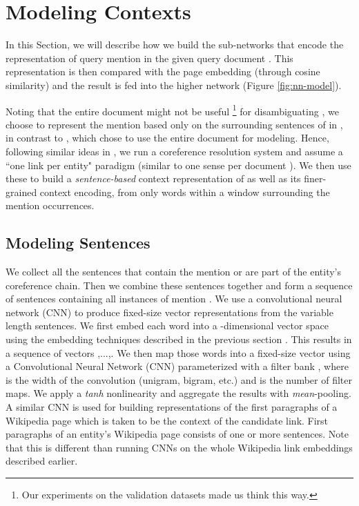 \documentclass[letterpaper]{article} \usepackage{aaai18}  \usepackage{times}  \usepackage{helvet}  \usepackage{courier}  \usepackage{url}  \usepackage{graphicx}  \frenchspacing  \setlength{\pdfpagewidth}{8.5in}  \setlength{\pdfpageheight}{11in}  \usepackage{latexsym}
\begin{document}
%
 \section{Modeling Contexts}
\label{sec:repr-details}
In this Section, we will describe how we build the sub-networks that encode the representation of query mention  in the given query document . This representation is then compared with the page embedding (through cosine similarity) and the result is fed into the higher network (Figure \ref{fig:nn-model}).

Noting that the entire document  might not be useful \footnote{Our experiments on the validation datasets made us think this way.} for disambiguating , we choose to represent the mention  based only on the surrounding sentences of  in , in contrast to \cite{he2013learning,berkeleyNNEL}, which chose to use the entire document for modeling.
Hence, following similar ideas in \cite{barrena2014one,lee2012joint}, we run a coreference resolution system \cite{luo2004mention} and assume a ``one link per entity" paradigm (similar to one sense per document \cite{gale1992one,yarowsky1993one}). We then use these to build a \emph{sentence-based} context representation of  as well as its finer-grained context encoding, from only words within a window surrounding the mention occurrences. 


\subsection{Modeling Sentences}
\label{sentence-repr}
We collect all the sentences that contain the mention or are part of the entity's coreference chain. Then we combine these sentences together and form a sequence of sentences containing all instances of mention . We use a convolutional neural network (CNN) to produce fixed-size vector representations from the variable length sentences.
We first embed each word into a -dimensional vector space using the embedding techniques described in the previous section . This results in  a sequence of vectors ,...,. We then map those words into a fixed-size vector using a Convolutional Neural Network (CNN) parameterized with a filter bank , where  is the width of the convolution (unigram, bigram, etc.) and  is the number of filter maps. We apply a \textit{tanh} nonlinearity and aggregate the results with \textit{mean}-pooling. A similar CNN is used for building representations of the first paragraphs of a Wikipedia page which is taken to be the context of the candidate link. First paragraphs of an entity's Wikipedia page consists of one or more sentences. Note that this is different than running CNNs on the whole Wikipedia link embeddings described earlier.
\end{document}
